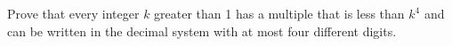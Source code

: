 Prove that every integer $k$ greater than 1 has a multiple that is less than $k^4$ and can be written in the decimal system with at most four different digits.
